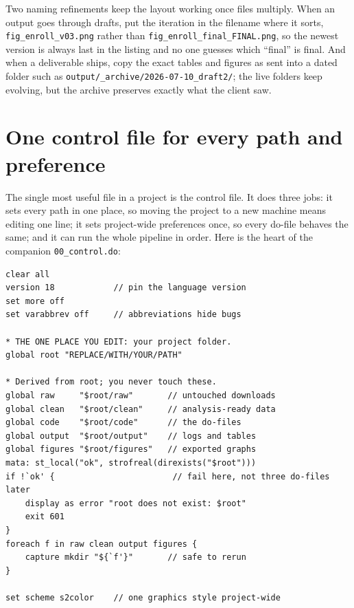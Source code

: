 Two naming refinements keep the layout working once files multiply. When an output goes through drafts, put the iteration in the filename where it sorts, \texttt{fig\_enroll\_v03.png} rather than \texttt{fig\_enroll\_final\_FINAL.png}, so the newest version is always last in the listing and no one guesses which \enquote{final} is final. And when a deliverable ships, copy the exact tables and figures as sent into a dated folder such as \texttt{output/\_archive/2026-07-10\_draft2/}; the live folders keep evolving, but the archive preserves exactly what the client saw.

\section{One control file for every path and preference}\label{sec:control}
The single most useful file in a project is the control file. It does three jobs: it sets every path in one place, so moving the project to a new machine means editing one line; it sets project-wide preferences once, so every do-file behaves the same; and it can run the whole pipeline in order. Here is the heart of the companion \texttt{00\_control.do}:
\par
{\footnotesize
\begin{verbatim}
clear all
version 18            // pin the language version
set more off
set varabbrev off     // abbreviations hide bugs

* THE ONE PLACE YOU EDIT: your project folder.
global root "REPLACE/WITH/YOUR/PATH"

* Derived from root; you never touch these.
global raw     "$root/raw"       // untouched downloads
global clean   "$root/clean"     // analysis-ready data
global code    "$root/code"      // the do-files
global output  "$root/output"    // logs and tables
global figures "$root/figures"   // exported graphs
mata: st_local("ok", strofreal(direxists("$root")))
if !`ok' {                        // fail here, not three do-files later
    display as error "root does not exist: $root"
    exit 601
}
foreach f in raw clean output figures {
    capture mkdir "${`f'}"       // safe to rerun
}

set scheme s2color    // one graphics style project-wide
\end{verbatim}
}
